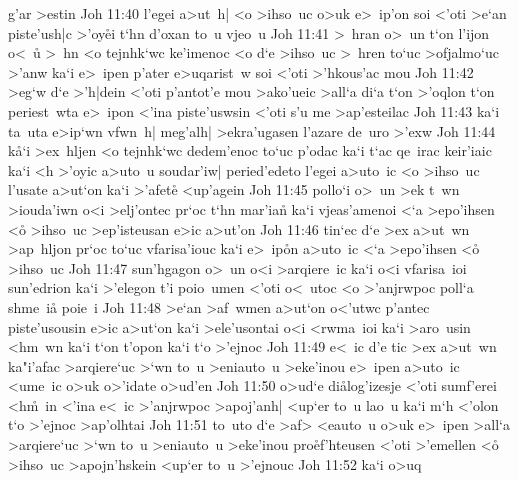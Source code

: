 g'ar
>estin\bibvsend
\vs Joh 11:40
l'egei
a>ut~h|
<o
>ihso~uc
o>uk
e>~ip'on
soi
<'oti
>e`an
piste'ush|c
>'oy\r{e}i
t`hn
d'oxan
to~u
vjeo~u\bibvsend
\vs Joh 11:41
>~hran
o>~un
t`on
l'ijon
o<~u\r{}
>~hn
<o
tejnhk`wc
ke'imenoc
<o
d`e
>ihso~uc
>~hren
to`uc
>ofjalmo`uc
>'anw
ka`i
e>~ipen
p'ater
e>uqarist~w
soi
<'oti
>'hkous'ac
mou\bibvsend
\vs Joh 11:42
>eg`w
d`e
>'h|dein
<'oti
p'antot'e
mou
>ako'ueic
>all`a
di`a
t`on
>'oqlon
t`on
periest~wta
e>~ipon
<'ina
piste'uswsin
<'oti
s'u
me
>ap'esteilac\bibvsend
\vs Joh 11:43
ka`i
ta~uta
e>ip`wn
vfwn~h|
meg'alh|
>ekra'ugasen
l'azare
de~uro
>'exw\bibvsend
\vs Joh 11:44
k\r{a}`i
>ex~hljen
<o
tejnhk`wc
dedem'enoc
to`uc
p'odac
ka`i
t`ac
qe~irac
keir'iaic
ka`i
<h
>'oyic
a>uto~u
soudar'iw|
peried'edeto
l'egei
a>uto~ic
<o
>ihso~uc
l'usate
a>ut`on
ka`i
>'afet\r{e}
<up'agein\bibvsend
\vs Joh 11:45
pollo`i
o>~un
>ek
t~wn
>iouda'iwn
o<i
>elj'ontec
pr`oc
t`hn
mar'ia\r{n}
ka`i
vjeas'amenoi
<`a
>epo'ihsen
<o\r{}
>ihso~uc
>ep'isteusan
e>ic
a>ut'on\bibvsend
\vs Joh 11:46
tin`ec
d`e
>ex
a>ut~wn
>ap~hljon
pr`oc
to`uc
vfarisa'iouc
ka`i
e>~ip\r{o}n
a>uto~ic
<`a
>epo'ihsen
<o\r{}
>ihso~uc\bibvsend
\vs Joh 11:47
sun'hgagon
o>~un
o<i
>arqiere~ic
ka`i
o<i
vfarisa~ioi
sun'edrion
ka`i
>'elegon
t'i
poio~umen
<'oti
o<~utoc
<o
>'anjrwpoc
poll`a
shme~ia\r{}
poie~i\bibvsend
\vs Joh 11:48
>e`an
>af~wmen
a>ut`on
o<'utwc
p'antec
piste'usousin
e>ic
a>ut`on
ka`i
>ele'usontai
o<i
<rwma~ioi
ka`i
>aro~usin
<hm~wn
ka`i
t`on
t'opon
ka`i
t`o
>'ejnoc\bibvsend
\vs Joh 11:49
e<~ic
d'e
tic
>ex
a>ut~wn
ka"i'afac
>arqiere`uc
>`wn
to~u
>eniauto~u
>eke'inou
e>~ipen
a>uto~ic
<ume~ic
o>uk
o>'idate
o>ud'en\bibvsend
\vs Joh 11:50
o>ud`e
di\r{a}log'izesje
<'oti
sumf'erei
<h\r{m}~in
<'ina
e<~ic
>'anjrwpoc
>apoj'anh|
<up`er
to~u
lao~u
ka`i
m`h
<'olon
t`o
>'ejnoc
>ap'olhtai\bibvsend
\vs Joh 11:51
to~uto
d`e
>af>
<eauto~u
o>uk
e>~ipen
>all`a
>arqiere`uc
>`wn
to~u
>eniauto~u
>eke'inou
pro\r{e}f'hteusen
<'oti
>'emellen
<o\r{}
>ihso~uc
>apojn'hskein
<up`er
to~u
>'ejnouc\bibvsend
\vs Joh 11:52
ka`i
o>uq
